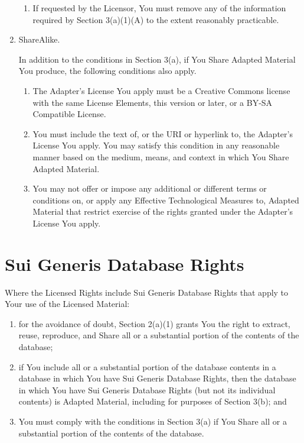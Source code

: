 \begin{enumerate}[label=\alph*.]
\begin{enumerate}[label=\arabic*.]
  \item If requested by the Licensor, You must remove any of the
    information required by Section 3(a)(1)(A) to the extent
    reasonably practicable.
  \end{enumerate}

\item ShareAlike.

  In addition to the conditions in Section 3(a), if You Share Adapted
  Material You produce, the following conditions also apply.

  \begin{enumerate}[label=\arabic*.]
  \item The Adapter's License You apply must be a Creative Commons
    license with the same License Elements, this version or
    later, or a BY-SA Compatible License.

  \item You must include the text of, or the URI or hyperlink to, the
    Adapter's License You apply. You may satisfy this condition
    in any reasonable manner based on the medium, means, and
    context in which You Share Adapted Material.

  \item You may not offer or impose any additional or different terms
    or conditions on, or apply any Effective Technological
    Measures to, Adapted Material that restrict exercise of the
    rights granted under the Adapter's License You apply.
  \end{enumerate}
\end{enumerate}

\section{Sui Generis Database Rights}

Where the Licensed Rights include Sui Generis Database Rights that
apply to Your use of the Licensed Material:

\begin{enumerate}[label=\alph*.]
\item for the avoidance of doubt, Section 2(a)(1) grants You the right
  to extract, reuse, reproduce, and Share all or a substantial portion
  of the contents of the database;

\item if You include all or a substantial portion of the database
  contents in a database in which You have Sui Generis Database
  Rights, then the database in which You have Sui Generis Database
  Rights (but not its individual contents) is Adapted Material,
  including for purposes of Section 3(b); and

\item You must comply with the conditions in Section 3(a) if You Share
  all or a substantial portion of the contents of the database.
\end{enumerate}

